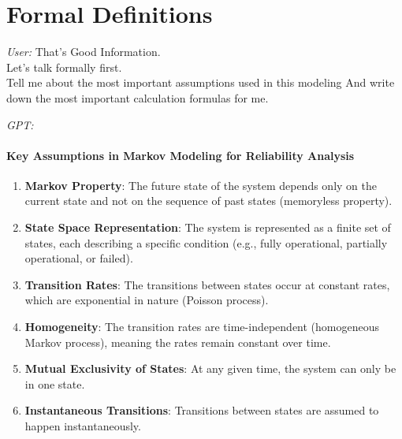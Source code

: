 \documentclass[a4paper,12pt]{article}
\begin{document}
	
	
	\section{Formal Definitions}
	\begin{questionbox}
		\textit{User:} That's Good Information.\\
		Let's talk formally first.\\
		Tell me about the most important assumptions used in this modeling
		And write down the most important calculation formulas for me.
	\end{questionbox}
	
	
	
	
	\begin{answerbox}
		\textit{GPT:}
		\paragraph{Key Assumptions in Markov Modeling for Reliability Analysis}
		
		\begin{enumerate}
			\item 
			\textbf{Markov Property}:  
			The future state of the system depends only on the current state and not on the sequence of past states (memoryless property).
			
			\item 
			\textbf{State Space Representation}:  
			The system is represented as a finite set of states, each describing a specific condition (e.g., fully operational, partially operational, or failed).
			
			\item 
			\textbf{Transition Rates}:  
			The transitions between states occur at constant rates, which are exponential in nature (Poisson process).
			
			\item 
			\textbf{Homogeneity}:  
			The transition rates are time-independent (homogeneous Markov process), meaning the rates remain constant over time.
			
			\item 
			\textbf{Mutual Exclusivity of States}:  
			At any given time, the system can only be in one state.
			
			\item 
			\textbf{Instantaneous Transitions}:  
			Transitions between states are assumed to happen instantaneously.
		\end{enumerate}
		

\end{answerbox}
\end{document}
